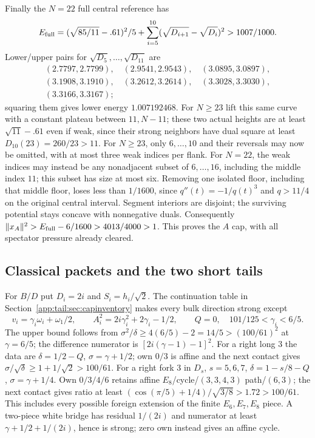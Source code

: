 \documentclass[11pt]{article}
\theoremstyle{definition}
\theoremstyle{remark}
\begin{document}
Finally the $N=22$ full central reference has
\[
 E_{\rm full}=(\sqrt{85/11}-.61)^2/5+
       \sum_{i=5}^{10}(\sqrt{D_{i+1}}-\sqrt{D_i})^2>1007/1000.
\]
Lower/upper pairs for $\sqrt{D_5},\ldots,\sqrt{D_{11}}$ are
\[
\begin{gathered}
(2.7797,2.7799),\quad(2.9541,2.9543),\quad(3.0895,3.0897),\\
(3.1908,3.1910),\quad(3.2612,3.2614),\quad(3.3028,3.3030),\\
(3.3166,3.3167);
\end{gathered}
\]
squaring them gives lower energy $1.007192468$.
For $N\ge23$ lift this same curve with a constant plateau between
$11,N-11$; these two actual heights are at least $\sqrt{11}-.61$
even if weak, since their strong neighbors have dual square at least
$D_{10}(23)=260/23>11$.
For $N\ge23$, only $6,\ldots,10$ and their reversals may now be omitted,
with at most three weak indices per flank. For $N=22$, the weak indices
may instead be any nonadjacent subset of $6,\ldots,16$, including the
middle index $11$; this subset has size at most six.
Removing one isolated floor, including that middle floor, loses
less than $1/1600$, since $q''(t)=-1/q(t)^3$ and $q>11/4$ on
the original central interval. Segment interiors are disjoint;
the surviving potential stays concave with nonnegative duals.
Consequently $\|x_A\|^2>E_{\rm full}-6/1600>4013/4000>1$.
This proves the $A$ cap, with all spectator pressure already cleared.

\subsection{Classical packets and the two short tails}
\label{app:tail:sec:BDcaps}

For $B/D$ put $D_i=2i$ and $S_i=h_i/\sqrt2$.
The continuation table in Section~\ref{app:tail:sec:capinventory} makes every
bulk direction strong except
\begin{equation}\label{app:tail:eq:capclassicalpacket}
 v_i=\gamma_i\omega_i+\omega_1/2,\qquad
 A_i^2=2i\gamma_i^2+2\gamma_i-1/2,\qquad Q=0,
 \quad101/125<\gamma_i<6/5.
\end{equation}
The upper bound follows from
$\sigma^2/\delta\ge4(6/5)-2=14/5>(100/61)^2$ at $\gamma=6/5$;
the difference numerator is $[2i(\gamma-1)-1]^2$.
For a right long $3$ the data are
$\delta=1/2-Q$, $\sigma=\gamma+1/2$; own $0/3$ is affine and
the next contact gives $\sigma/\sqrt\delta\ge1+1/\sqrt2>100/61$.
For a right fork $3$ in $D_s$, $s=5,6,7$,
$\delta=1-s/8-Q$, $\sigma=\gamma+1/4$.
Own $0/3/4/6$ retains affine $E_8$/cycle/$(3,3,4,3)$ path/$(6,3)$;
the next contact gives ratio at least
$(\cos(\pi/5)+1/4)/\sqrt{3/8}>1.72>100/61$.
This includes every possible foreign extension of the finite
$E_6,E_7,E_8$ piece. A two-piece white bridge has residual
$1/(2i)$ and numerator at least $\gamma+1/2+1/(2i)$, hence is
strong; zero own instead gives an affine cycle.
\end{document}
